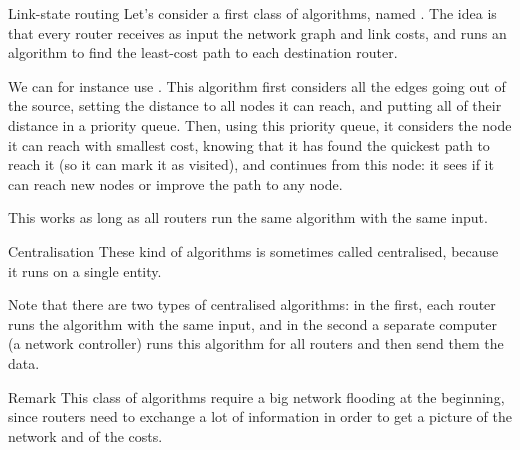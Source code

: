 \documentclass[a4paper]{article}
\begin{document}
\begin{parag}{Link-state routing}
    Let's consider a first class of algorithms, named . The idea is that every router receives as input the network graph and link costs, and runs an algorithm to find the least-cost path to each destination router. 

    We can for instance use . This algorithm first considers all the edges going out of the source, setting the distance to all nodes it can reach, and putting all of their distance in a priority queue. Then, using this priority queue, it considers the node it can reach with smallest cost, knowing that it has found the quickest path to reach it (so it can mark it as visited), and continues from this node: it sees if it can reach new nodes or improve the path to any node. 

    This works as long as all routers run the same algorithm with the same input.

    \begin{subparag}{Centralisation}
        These kind of algorithms is sometimes called centralised, because it runs on a single entity.

        Note that there are two types of centralised algorithms: in the first, each router runs the algorithm with the same input, and in the second a separate computer (a network controller) runs this algorithm for all routers and then send them the data.
    \end{subparag}

    \begin{subparag}{Remark}
        This class of algorithms require a big network flooding at the beginning, since routers need to exchange a lot of information in order to get a picture of the network and of the costs.
    \end{subparag}
    
\end{parag}
\end{document}
